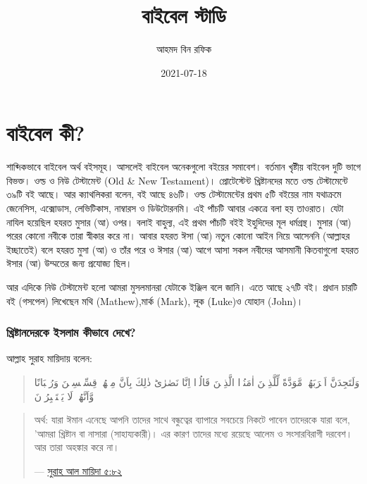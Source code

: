 \documentclass[
]{book}
\title{বাইবেল স্টাডি}
\author{আহমদ বিন রফিক}
\date{2021-07-18}
\begin{document}
\maketitle

{
\setcounter{tocdepth}{1}
\tableofcontents
}
\hypertarget{about-bible}{%
\chapter*{বাইবেল কী?}\label{about-bible}}

শাব্দিকভাবে বাইবেল অর্থ বইসমূহ। আসলেই বাইবেল অনেকগুলো বইয়ের সমাবেশ। বর্তমান খৃষ্টীয় বাইবেল দুটি ভাগে বিভক্ত। ওল্ড ও নিউ টেস্টামেন্ট (Old \& New Testament)। প্রোটেস্টেন্ট খ্রিষ্টানদের মতে ওল্ড টেস্টামেন্টে ৩৯টি বই আছে। আর ক্যাথলিকরা বলেন, বই আছে ৪৬টি। ওল্ড টেস্টামেন্টের প্রথম ৫টি বইয়ের নাম যথাক্রমে জেনেসিস, এক্সোডাস, লেভিটিকাস, নাম্বারস ও ডিউটোরনমি। এই পাঁচটি আবার একত্রে বলা হয় তাওরাত। যেটা নাযিল হয়েছিল হযরত মুসার (আ) ওপর। বলাই বাহুল্য, এই প্রথম পাঁচটি বইই ইহুদিদের মূল ধর্মগ্রন্থ। মুসার (আ) পরের কোনো নবীকে তারা স্বীকার করে না। আবার হযরত ঈসা (আ) নতুন কোনো আইন নিয়ে আসেননি (আল্লাহর ইচ্ছাতেই) বলে হযরত মুসা (আ) ও তাঁর পরে ও ঈসার (আ) আগে আসা সকল নবীদের আসমানী কিতবাগুলো হযরত ঈসার (আ) উম্মতের জন্য প্রযোজ্য ছিল।

আর এদিকে নিউ টেস্টামেন্ট হলো আমরা মুসলমানরা যেটাকে ইঞ্জিল বলে জানি। এতে আছে ২৭টি বই। প্রধান চারটি বই (গসপেল) লিখেছেন মথি (Mathew),মার্ক (Mark), লূক (Luke)ও যোহান (John)।

\hypertarget{islam-on-christians}{%
\subsection*{খ্রিষ্টানদেরকে ইসলাম কীভাবে দেখে?}\label{islam-on-christians}}

আল্লাহ সুরাহ মায়িদায় বলেন:

\begin{quote}
وَلَتَجِدَنَّ اَقۡرَبَهُمۡ مَّوَدَّةً لِّلَّذِيۡنَ اٰمَنُوۡا الَّذِيۡنَ قَالُوۡۤا اِنَّا نَصٰرٰى‌ؕ ذٰلِكَ بِاَنَّ مِنۡهُمۡ قِسِّيۡسِيۡنَ وَرُهۡبَانًا وَّاَنَّهُمۡ لَا يَسۡتَكۡبِرُوۡنَ
\end{quote}

\begin{quote}
অর্থ: যারা ঈমান এনেছে আপনি তাদের সাথে বন্ধুত্বের ব্যাপারে সবচেয়ে নিকটে পাবেন তাদেরকে যারা বলে, 'আমরা খ্রিষ্টান বা নাসারা (সাহায্যকারী)। এর কারণ তাদের মধ্যে রয়েছে আলেম ও সংসারবিরাগী দরবেশ। আর তারা অহঙ্কার করে না।

--- \href{http://tafheembangla.com/index.php/quran?show=quran\&surah_no=5\&limitstart=81}{সুরাহ আল মায়িদা ৫:৮২}
\end{quote}
\end{document}
